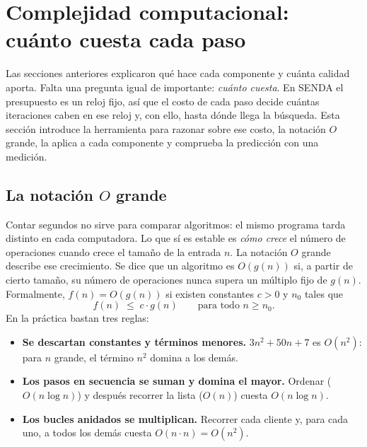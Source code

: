 \documentclass[11pt,a4paper]{article}
\begin{document}
\section{Complejidad computacional: cuánto cuesta cada paso}
\label{sec:complejidad}

Las secciones anteriores explicaron qué hace cada componente y cuánta calidad aporta. Falta una
pregunta igual de importante: \emph{cuánto cuesta}. En SENDA el presupuesto es un reloj fijo, así que
el costo de cada paso decide cuántas iteraciones caben en ese reloj y, con ello, hasta dónde llega la
búsqueda. Esta sección introduce la herramienta para razonar sobre ese costo, la notación $O$ grande,
la aplica a cada componente y comprueba la predicción con una medición.

\subsection{La notación $O$ grande}

Contar segundos no sirve para comparar algoritmos: el mismo programa tarda distinto en cada
computadora. Lo que sí es estable es \emph{cómo crece} el número de operaciones cuando crece el
tamaño de la entrada $n$. La notación $O$ grande describe ese crecimiento. Se dice que un algoritmo es
$O(g(n))$ si, a partir de cierto tamaño, su número de operaciones nunca supera un múltiplo fijo de
$g(n)$. Formalmente, $f(n)=O(g(n))$ si existen constantes $c>0$ y $n_0$ tales que
\begin{equation}
f(n)\;\le\;c\cdot g(n)\qquad\text{para todo } n\ge n_0 .
\end{equation}
En la práctica bastan tres reglas:
\begin{itemize}[leftmargin=1.5em]
\item \textbf{Se descartan constantes y términos menores.} $3n^2+50n+7$ es $O(n^2)$: para $n$ grande,
el término $n^2$ domina a los demás.
\item \textbf{Los pasos en secuencia se suman y domina el mayor.} Ordenar ($O(n\log n)$) y después
recorrer la lista ($O(n)$) cuesta $O(n\log n)$.
\item \textbf{Los bucles anidados se multiplican.} Recorrer cada cliente y, para cada uno, a todos
los demás cuesta $O(n\cdot n)=O(n^2)$.
\end{itemize}
\end{document}
